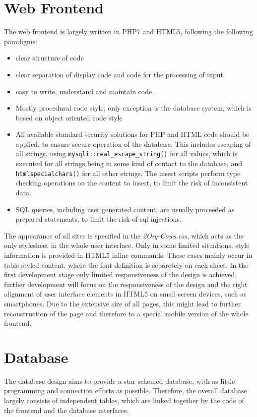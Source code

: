 \section{Web Frontend}
The web frontend is largely written in PHP7 and HTML5, following the following paradigms: 
\begin{itemize}
 \item clear structure of code
 \item clear separation of display code and code for the processing of input
 \item easy to write, understand and maintain code
 \item Mostly procedural code style, only exception is the database system, which is based on object oriented code style
 \item All available standard security solutions for PHP and HTML code should be applied, to ensure secure operation of the database. This includes escaping of all strings, using 
 \texttt{mysqli::real\_escape\_string()} for all values, which is executed for all strings being in some kind of contact to the database, and \texttt{htmlspecialchars()} for all other strings. 
 The insert scripts perform type checking operations on the content to insert, to limit the risk of inconsistent data.
 \item SQL queries, including user generated content, are usually proceeded as prepared statements, to limit the risk of sql injections.
\end{itemize}
The appearance of all sites is specified in the \emph{2Org-Cows.css}, which acts as the only stylesheet in the whole user interface. Only in some limited situations, style information is 
provided in HTML5 inline commands. These cases mainly occur in table-styled content, where the font definition is separetely on each sheet.  
In the first development stage only limited responsiveness of the design is achieved, further development will focus on the responsiveness of the design
and the right alignment of user interface elements in HTML5 on small screen devices, such as smartphones. Due to the extensive size of all pages, this might lead to further 
reconstruction of the page and therefore to a special mobile version of the whole frontend.
\section{Database}
The database design aims to provide a star schemed database, with as little programming and connection efforts as possible. Therefore, the overall database largely consists of 
independent tables, which are linked together by the code of the frontend and the database interfaces.
